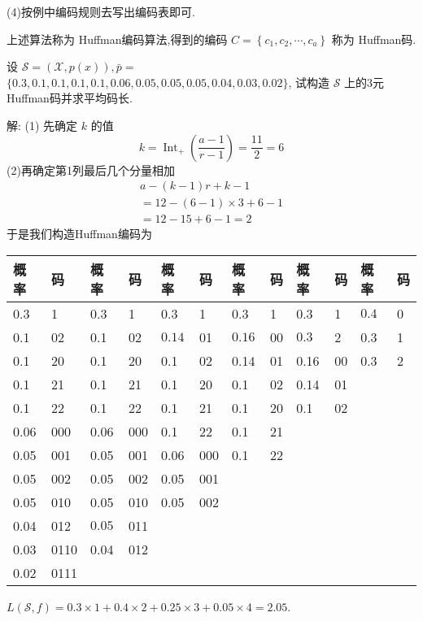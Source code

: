 (4)按例中编码规则去写出编码表即可.

上述算法称为 Huffman编码算法,得到的编码
$
C=\left\{c_{1}, c_{2}, \cdots, c_{a}\right\}
$
称为 Huffman码.

\begin{example}
    设 $ \mathscr{S}=(\mathscr{X}, p(x)), \bar{p}= $ $ \{0.3,0.1,0.1,0.1,0.1,0.06,0.05,0.05,0.05,0.04,0.03,0.02\} $, 试构造 $ \mathscr{S} $ 上的3元Huffman码并求平均码长.

    解: (1) 先确定 $ {k} $ 的值
$$
k=\operatorname{I n t}_{+}\left(\frac{a-1}{r-1}\right)=\frac{11}{2}=6
$$
(2)再确定第1列最后几个分量相加
$$
\begin{array}{l}
a-(k-1) r+k-1 \\
=12-(6-1) \times 3+6-1 \\
=12-15+6-1=2
\end{array}
$$
于是我们构造Huffman编码为
\begin{center}
\begin{tabular}{ll||ll||ll||ll||ll||ll} 
\hline
概率 & 码 & 概率 & 码 & 概率 & 码 &概率 & 码 & 概率 & 码 & 概率 & 码 \\
\hline
0.3 & 1 & 0.3 & 1 & 0.3 & 1 &0.3 & 1 & 0.3 & 1 &$\boxed{0.4} $ & 0 \\
0.1 & 02 & 0.1 & 02 & $ \boxed{0.14} $ & 01 &$ \boxed{0.16} $ & 00 & $ \boxed{0.3} $ & 2 & 0.3 & 1 \\
0.1 & 20 & 0.1 & 20 & 0.1 & 02 &0.14 & 01 & 0.16 & 00 & 0.3 & 2 \\
0.1 & 21 & 0.1 & 21 & 0.1 & 20 &0.1 & 02 & 0.14 & 01  & \\
0.1 & 22 & 0.1 & 22 & 0.1 & 21 &0.1 & 20 & 0.1 & 02 & \\
0.06 & 000 & 0.06 & 000 & 0.1 & 22 &0.1 & 21 & & & \\
0.05 & 001 & 0.05 & 001 & 0.06 & 000 &0.1 & 22 & & & \\
0.05 & 002 & 0.05 & 002 & 0.05 & 001 & & & &\\
0.05 & 010 & 0.05 & 010 & 0.05 & 002 & & & &\\
0.04 & 012 & $\boxed{0.05}$ & 011 & & & & & &\\
0.03 & 0110 & 0.04 & 012 & & & & & &\\
0.02 & 0111 & & & & & & & &\\
\hline
\end{tabular}
\end{center}

$ L(\mathscr{S}, f)=0.3 \times 1+0.4 \times 2+0.25 \times 3+0.05 \times 4=2.05 $.

\end{example}

